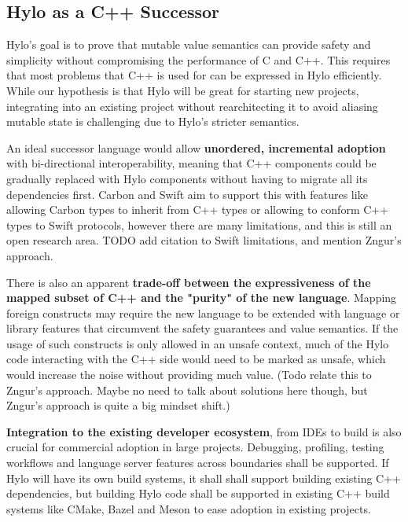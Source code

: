 \subsection{Hylo as a C++ Successor}
Hylo's goal is to prove that mutable value semantics can provide safety and simplicity without compromising the performance of C and C++\cite{hylo-lang}. This requires that most problems that C++ is used for can be expressed in Hylo efficiently. While our hypothesis is that Hylo will be great for starting new projects, integrating into an existing project without rearchitecting it to avoid aliasing mutable state is challenging  due to Hylo's stricter semantics.

An ideal successor language would allow \textbf{unordered, incremental adoption} with bi-directional interoperability\cite{requirements-for-cpp-successor-languages}, meaning that C++ components could be gradually replaced with Hylo components without having to migrate all its dependencies first. Carbon and Swift aim to support this with features like allowing Carbon types to inherit from C++ types\cite{carbon-interop-goals} or allowing to conform C++ types to Swift protocols\cite{swift-cpp-post-hoc-conformance}, however there are many limitations, and this is still an open research area. TODO add citation to Swift limitations, and mention Zngur's approach.

There is also an apparent \textbf{trade-off between the expressiveness of the mapped subset of C++ and the "purity" of the new language}. Mapping foreign constructs may require the new language to be extended with language or library features that circumvent the safety guarantees and value semantics. If the usage of such constructs is only allowed in an unsafe context, much of the Hylo code interacting with the C++ side would need to be marked as unsafe, which would increase the noise without providing much value. (Todo relate this to Zngur's approach. Maybe no need to talk about solutions here though, but Zngur's approach is quite a big mindset shift.)

\textbf{Integration to the existing developer ecosystem}, from IDEs to build is also crucial for commercial adoption in large projects. Debugging, profiling, testing workflows and language server features across boundaries shall be supported.\cite{requirements-for-cpp-successor-languages} If Hylo will have its own build systems, it shall shall support building existing C++ dependencies, but building Hylo code shall be supported in existing C++ build systems like CMake, Bazel and Meson to ease adoption in existing projects.

